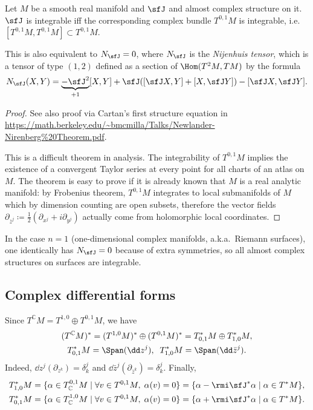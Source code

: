 \begin{thm}
    Let $M$ be a smooth real manifold and $\sfJ$ and almost complex structure on it. $\sfJ$ is integrable iff the corresponding complex bundle $T^{0,1}M$ is integrable, i.e.\ $[T^{0,1}M,T^{0,1}M]\subset T^{0,1}M$.
    
    This is also equivalent to $N_\sfJ=0$, where $N_\sfJ$ is the \emph{Nijenhuis tensor}, which is a tensor of type $(1,2)$ defined as a section of $\Hom(T^2M,TM)$ by the formula
    \[N_\sfJ(X,Y)=\underbrace{-\sfJ^2}_{+1}[X,Y]+\sfJ([\sfJ X,Y]+[X,\sfJ Y])-[\sfJ X,\sfJ Y].\]
\end{thm}
\begin{proof}
    See also proof via Cartan's first structure equation  in \url{https://math.berkeley.edu/~bmcmilla/Talks/Newlander-Nirenberg%20Theorem.pdf}.
    
    This is a difficult theorem in analysis. The integrability of $T^{0,1}M$ implies the existence of a convergent Taylor series at every point for all charts of an atlas on $M$. The theorem is easy to prove if it is already known that $M$ is a real analytic manifold: by Frobenius theorem, $T^{0,1}M$ integrates to local submanifolds of $M$ which by dimension counting are open subsets, therefore the vector fields $\partial_{\bar z^j}\coloneqq\frac12(\partial_{x^j}+i\partial_{y^j})$ actually come from holomorphic local coordinates.
\end{proof}

\begin{rem}
    In the case $n=1$ (one-dimensional complex manifolds, a.k.a.\ Riemann surfaces), one identically has $N_\sfJ=0$ because of extra symmetries, so all almost complex structures on surfaces are integrable.
\end{rem}





\subsection{Complex differential forms}

Since $T^\mathbb{C}M=T^{1,0}\oplus T^{0,1}M$, we have
\begin{gather}
    (T^\mathbb{C}M)^\ast=(T^{1,0}M)^\ast \oplus (T^{0,1}M)^\ast=T^\ast_{0,1}M\oplus T^\ast_{1,0}M,\\ T^\ast_{0,1}M=\Span(\dd z^j),\;\; T^\ast_{1,0}M=\Span(\dd\bar z^j).
\end{gather}
Indeed, $\dd z^j(\partial_{z^k})=\delta^j_k$ and $\dd \bar z^j (\partial_{\bar z^k})=\delta^j_k$.
Finally, 
\begin{align}
    T^\ast_{1,0}M=\{\alpha\in T^{0,1}_{\mathbb{C}}M\mid \forall v\in T^{0,1}M,\; \alpha(v)=0\}=\{\alpha-\rmi\sfJ^\ast\alpha\mid \alpha\in T^\ast M\},\\
    T^\ast_{0,1}M=\{\alpha\in T^{1,0}_{\mathbb{C}}M\mid \forall v\in T^{0,1}M,\; \alpha(v)=0\}=\{\alpha+\rmi\sfJ^\ast\alpha\mid \alpha\in T^\ast M\}.
\end{align}

